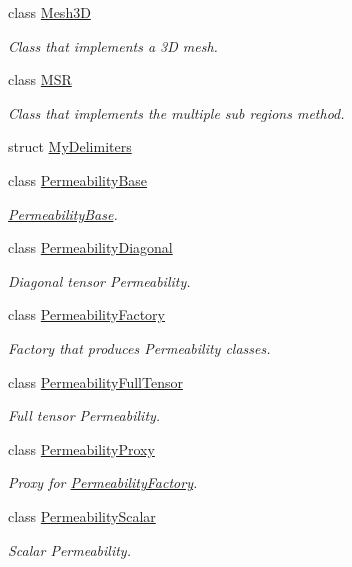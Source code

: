 \begin{DoxyCompactItemize}
class \hyperlink{classFVCode3D_1_1Mesh3D}{Mesh3D}
\begin{DoxyCompactList}\small\item\em Class that implements a 3D mesh. \end{DoxyCompactList}\item 
class \hyperlink{classFVCode3D_1_1MSR}{M\+SR}
\begin{DoxyCompactList}\small\item\em Class that implements the multiple sub regions method. \end{DoxyCompactList}\item 
struct \hyperlink{structFVCode3D_1_1MyDelimiters}{My\+Delimiters}
\item 
class \hyperlink{classFVCode3D_1_1PermeabilityBase}{Permeability\+Base}
\begin{DoxyCompactList}\small\item\em \hyperlink{classFVCode3D_1_1PermeabilityBase}{Permeability\+Base}. \end{DoxyCompactList}\item 
class \hyperlink{classFVCode3D_1_1PermeabilityDiagonal}{Permeability\+Diagonal}
\begin{DoxyCompactList}\small\item\em Diagonal tensor Permeability. \end{DoxyCompactList}\item 
class \hyperlink{classFVCode3D_1_1PermeabilityFactory}{Permeability\+Factory}
\begin{DoxyCompactList}\small\item\em Factory that produces Permeability classes. \end{DoxyCompactList}\item 
class \hyperlink{classFVCode3D_1_1PermeabilityFullTensor}{Permeability\+Full\+Tensor}
\begin{DoxyCompactList}\small\item\em Full tensor Permeability. \end{DoxyCompactList}\item 
class \hyperlink{classFVCode3D_1_1PermeabilityProxy}{Permeability\+Proxy}
\begin{DoxyCompactList}\small\item\em Proxy for \hyperlink{classFVCode3D_1_1PermeabilityFactory}{Permeability\+Factory}. \end{DoxyCompactList}\item 
class \hyperlink{classFVCode3D_1_1PermeabilityScalar}{Permeability\+Scalar}
\begin{DoxyCompactList}\small\item\em Scalar Permeability. \end{DoxyCompactList}\item 

\end{DoxyCompactItemize}
